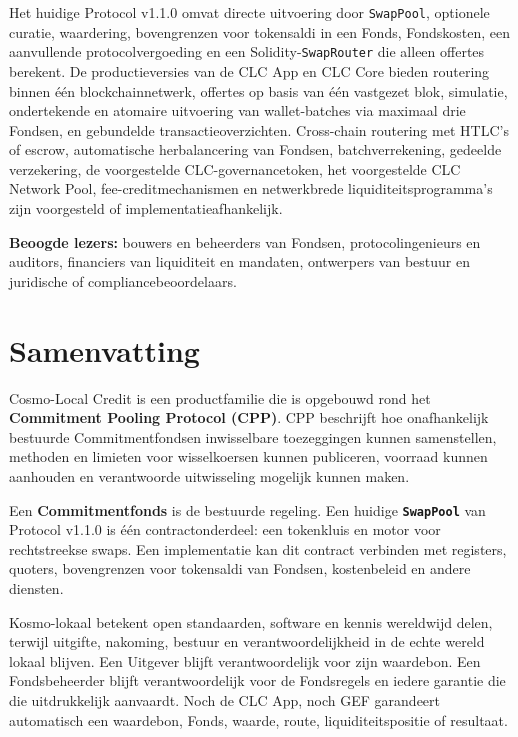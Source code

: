 \documentclass[11pt]{article}
\begin{document}
Het huidige Protocol v1.1.0 omvat directe uitvoering door \texttt{SwapPool}, optionele curatie, waardering, bovengrenzen voor tokensaldi in een Fonds, Fondskosten, een aanvullende protocolvergoeding en een Solidity-\texttt{SwapRouter} die alleen offertes berekent. De productieversies van de CLC App en CLC Core bieden routering binnen één blockchainnetwerk, offertes op basis van één vastgezet blok, simulatie, ondertekende en atomaire uitvoering van wallet-batches via maximaal drie Fondsen, en gebundelde transactieoverzichten. Cross-chain routering met HTLC's of escrow, automatische herbalancering van Fondsen, batchverrekening, gedeelde verzekering, de voorgestelde CLC-governancetoken, het voorgestelde CLC Network Pool, fee-creditmechanismen en netwerkbrede liquiditeitsprogramma's zijn voorgesteld of implementatieafhankelijk.

\textbf{Beoogde lezers:} bouwers en beheerders van Fondsen, protocolingenieurs en auditors, financiers van liquiditeit en mandaten, ontwerpers van bestuur en juridische of compliancebeoordelaars.

\section*{Samenvatting}

Cosmo-Local Credit is een productfamilie die is opgebouwd rond het \textbf{Commitment Pooling Protocol (CPP)}. CPP beschrijft hoe onafhankelijk bestuurde Commitmentfondsen inwisselbare toezeggingen kunnen samenstellen, methoden en limieten voor wisselkoersen kunnen publiceren, voorraad kunnen aanhouden en verantwoorde uitwisseling mogelijk kunnen maken.

Een \textbf{Commitmentfonds} is de bestuurde regeling. Een huidige \textbf{\texttt{SwapPool}} van Protocol v1.1.0 is één contractonderdeel: een tokenkluis en motor voor rechtstreekse swaps. Een implementatie kan dit contract verbinden met registers, quoters, bovengrenzen voor tokensaldi van Fondsen, kostenbeleid en andere diensten.

Kosmo-lokaal betekent open standaarden, software en kennis wereldwijd delen, terwijl uitgifte, nakoming, bestuur en verantwoordelijkheid in de echte wereld lokaal blijven. Een Uitgever blijft verantwoordelijk voor zijn waardebon. Een Fondsbeheerder blijft verantwoordelijk voor de Fondsregels en iedere garantie die die uitdrukkelijk aanvaardt. Noch de CLC App, noch GEF garandeert automatisch een waardebon, Fonds, waarde, route, liquiditeitspositie of resultaat.
\end{document}
